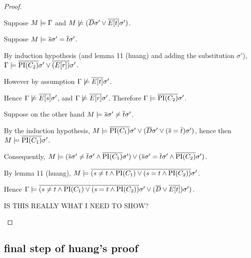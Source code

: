 \begin{proof}
\begin{description}
			Suppose $M \models \Gamma$ and $M \not \models (\overline{D}\sigma' \lor \overline{E[t]}\sigma') $.

			Suppose $M \models \overline{s}\sigma' = \overline{t}\sigma'$.

			By induction hypothesis (and lemma 11 (huang) and adding the substitution $\sigma'$), 
			$\Gamma \models \overline{\mathrm{PI}(C_2)}\sigma' \lor \overline{(E[r])}\sigma'$.

		However by assumption $\Gamma \not \models \overline{E[t]}\sigma'$.

		Hence $\Gamma \not \models \overline{E[s]}\sigma'$, and
		$\Gamma \not \models \overline{E[r]}\sigma'$. Therefore $\Gamma \models \overline{\mathrm{PI}(C_2)}\sigma'$.


		Suppose on the other hand $M \models \overline{s}\sigma' \neq \overline{t}\sigma'$.

		By the induction hypothesis, 
		$M \models \overline{\mathrm{PI}(C_1)}\sigma' \lor (\overline{D}\sigma'\lor (\overline{s}=\overline{t})\sigma')$,
		hence then $M \models \overline{\mathrm{PI}(C_1)}\sigma'$.

		Consequently, 
		$M \models (\overline{s}\sigma' \neq \overline{t}\sigma' \land \overline{\mathrm{PI}(C_1)}\sigma') \lor (\overline{s}\sigma' = \overline{t}\sigma' \land \overline{\mathrm{PI}(C_2)}\sigma')$.

		By lemma 11 (huang), 
		$M \models \overline{(s \neq {t} \land {\ensuremath{\mathrm{PI}}(C_1)} \lor ({s} = {t} \land \mathrm{PI}(C_2))}\sigma'$.

		Hence 
		$\Gamma \models \overline{(s \neq {t} \land {\ensuremath{\mathrm{PI}}(C_1)} \lor ({s} = {t} \land \mathrm{PI}(C_2))}\sigma' \lor (\overline{D} \lor \overline{E[t]})\sigma') $.

		IS THIS REALLY WHAT I NEED TO SHOW?


\end{description}
\end{proof}



\subsection{final step of huang's proof}

